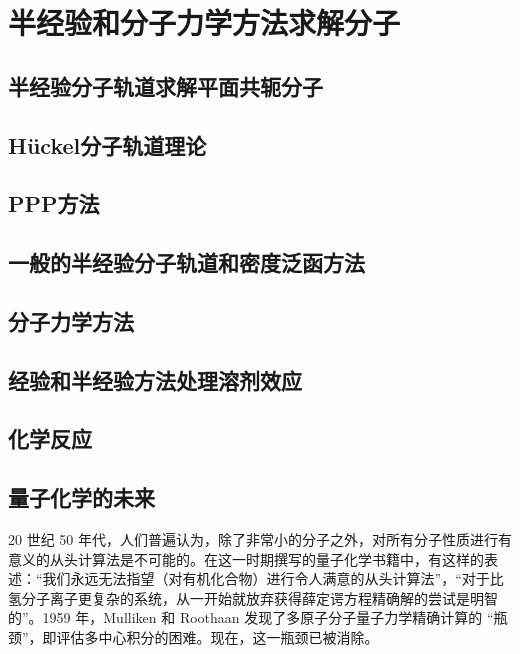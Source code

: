 \chapter{半经验和分子力学方法求解分子}
\label{chap:17}
\section{半经验分子轨道求解平面共轭分子}
\label{sec:17.1 Semiempirical MO Treatments of Planar Conjugated Molecules}

\section{Hückel分子轨道理论}
\label{sec:17.2 The Hückel MO Method}

\section{PPP方法}
\label{sec:17.3 The PPP Method}

\section{一般的半经验分子轨道和密度泛函方法}
\label{sec:17.4 General Semiempirical MO and DFT Methods}

\section{分子力学方法}
\label{sec:17.5 The Molecular-Mechanics Method}

\section{经验和半经验方法处理溶剂效应}
\label{sec:17.6 Empirical and Semiempirical Treatments of Treating Solvent Effects}

\section{化学反应}
\label{sec:17.7 Chemical Reactions}

\section{量子化学的未来}
\label{sec:17.8 The Future of Quantum Chemistry}

	20 世纪 50 年代，人们普遍认为，除了非常小的分子之外，对所有分子性质进行有意义的从头计算法是不可能的。在这一时期撰写的量子化学书籍中，有这样的表述：“我们永远无法指望（对有机化合物）进行令人满意的从头计算法”，“对于比氢分子离子更复杂的系统，从一开始就放弃获得薛定谔方程精确解的尝试是明智的”。1959 年，Mulliken 和 Roothaan 发现了多原子分子量子力学精确计算的 “瓶颈”，即评估多中心积分的困难。现在，这一瓶颈已被消除。

